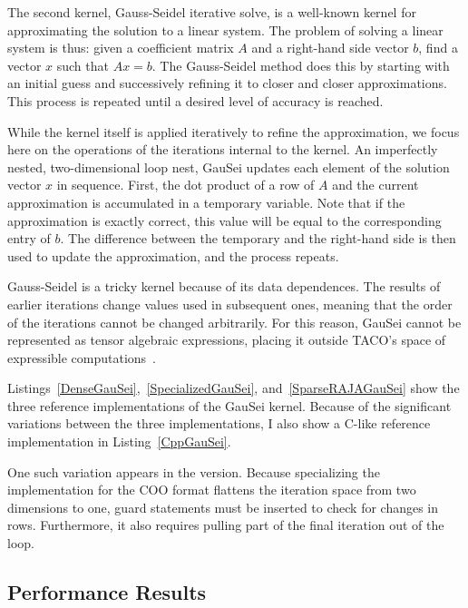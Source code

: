 The second kernel, Gauss-Seidel iterative solve, is a well-known kernel for approximating the solution to a linear system.
The problem of solving a linear system is thus: given a coefficient matrix $A$ and a right-hand side vector $b$, find a vector $x$ such that $Ax=b$.
The Gauss-Seidel method does this by starting with an initial guess and successively refining it to closer and closer approximations.
This process is repeated until a desired level of accuracy is reached.

While the kernel itself is applied iteratively to refine the approximation, we focus here on the operations of the iterations internal to the kernel.
An imperfectly nested, two-dimensional loop nest, GauSei updates each element of the solution vector $x$ in sequence.
First, the dot product of a row of $A$ and the current approximation is accumulated in a temporary variable.
Note that if the approximation is exactly correct, this value will be equal to the corresponding entry of $b$. 
The difference between the temporary and the right-hand side is then used to update the approximation, and the process repeats.

Gauss-Seidel is a tricky kernel because of its data dependences.
The results of earlier iterations change values used in subsequent ones, meaning that the order of the iterations cannot be changed arbitrarily. 
For this reason, GauSei cannot be represented as tensor algebraic expressions, placing it outside TACO's space of expressible computations~\cite{}.

Listings~\ref{DenseGauSei},~\ref{SpecializedGauSei}, and~\ref{SparseRAJAGauSei} show the three reference implementations of the GauSei kernel.
Because of the significant variations between the three implementations, I also show a C-like reference implementation in Listing~\ref{CppGauSei}.

One such variation appears in the \specialized{} version. 
Because specializing the implementation for the COO format flattens the iteration space from two dimensions to one, guard statements must be inserted to check for changes in rows. 
Furthermore, it also requires pulling part of the final iteration out of the loop.

\subsection{Performance Results}

